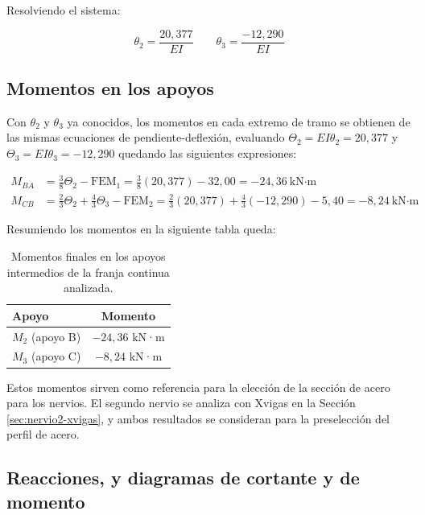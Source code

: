 ﻿\documentclass[12pt,letterpaper]{article}
\begin{document}
Resolviendo el sistema:

\begin{equation}
\theta_2 = \frac{20{,}377}{EI} \qquad \theta_3 = \frac{-12{,}290}{EI}
\end{equation}

\subsection{Momentos en los apoyos}

Con $\theta_2$ y $\theta_3$ ya conocidos, los momentos en cada extremo de tramo se obtienen de las mismas ecuaciones de pendiente-deflexión, evaluando $\Theta_2 = EI\theta_2 = 20{,}377$ y $\Theta_3 = EI\theta_3 = -12{,}290$ quedando las siguientes expresiones:

\begin{align*}
M_{BA} &= \frac{3}{8}\Theta_2 - \text{FEM}_1 = \frac{3}{8}(20{,}377) - 32{,}00 = -24{,}36 \ \text{kN·m} \\
M_{CB} &= \frac{2}{3}\Theta_2 + \frac{4}{3}\Theta_3 - \text{FEM}_2 = \frac{2}{3}(20{,}377) + \frac{4}{3}(-12{,}290) - 5{,}40 = -8{,}24 \ \text{kN·m}
\end{align*}

Resumiendo los momentos en la siguiente tabla queda: 

\begin{table}[H]
    \centering
    \begin{tabular}{>{\raggedright\arraybackslash}p{6cm} c}
        \toprule
        Apoyo & Momento \\
        \midrule
        $M_2$ (apoyo B) & $-24{,}36$ kN·m \\
        $M_3$ (apoyo C) & $-8{,}24$ kN·m \\
        \bottomrule
    \end{tabular}
    \caption{Momentos finales en los apoyos intermedios de la franja continua analizada.}
    \label{tab:momentos-nervio}
\end{table}

Estos momentos sirven como referencia para la elección de la sección de acero para los nervios. El segundo nervio se analiza con Xvigas en la Sección \ref{sec:nervio2-xvigas}, y ambos resultados se consideran para la preselección del perfil de acero.

\subsection{Reacciones, y diagramas de cortante y de momento}
\end{document}
